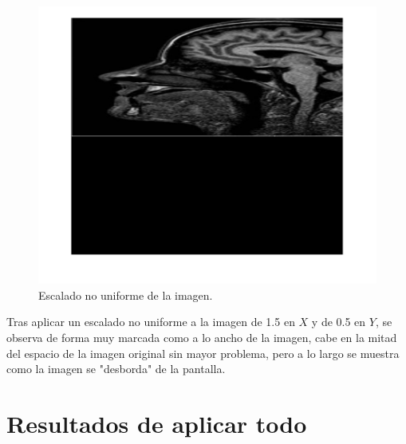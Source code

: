 \documentclass[11pt, letterpaper]{article}
\begin{document}
\begin{figure}[h!]
	\centering
	\begin{minipage}{0.8\textwidth}
		\centering
		\includegraphics[width=\textwidth]{IMG/R3.jpg}
		\caption{Escalado no uniforme de la imagen.}
		\label{fig:f9}
	\end{minipage}\hfill
\end{figure}

Tras aplicar un escalado no uniforme a la imagen de 1.5 en $X$ y de 0.5 en $Y$, se observa de forma muy marcada como a lo ancho de la imagen, cabe en la mitad del espacio de la imagen original sin mayor problema, pero a lo largo se muestra como la imagen se "desborda" de la pantalla.

\newpage

\section{Resultados de aplicar todo}
\end{document}
